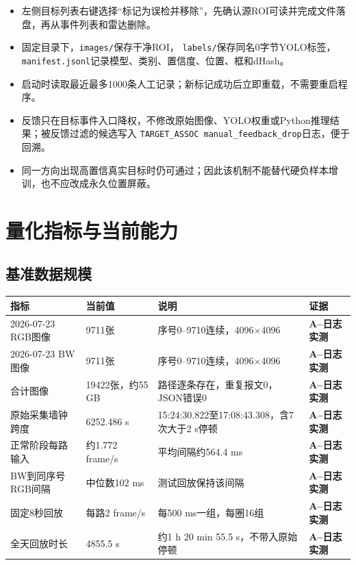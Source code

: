 \documentclass[UTF8,a4paper,11pt,openany]{ctexrep}
\newcommand{\metricA}{\textcolor{dmxgreen}{\textbf{A--日志实测}}}
\begin{document}
\begin{itemize}
  \item 左侧目标列表右键选择“标记为误检并移除”，先确认源ROI可读并完成文件落盘，再从事件列表和雷达删除。
  \item 固定目录下，\texttt{images/}保存干净ROI，
  \texttt{labels/}保存同名0字节YOLO标签，\texttt{manifest.jsonl}记录模型、类别、置信度、位置、框和dHash。
  \item 启动时读取最近最多1000条人工记录；新标记成功后立即重载，不需要重启程序。
  \item 反馈只在目标事件入口降权，不修改原始图像、YOLO权重或Python推理结果；被反馈过滤的候选写入
  \texttt{TARGET\_ASSOC manual\_feedback\_drop}日志，便于回溯。
  \item 同一方向出现高置信真实目标时仍可通过；因此该机制不能替代硬负样本增训，也不应改成永久位置屏蔽。
\end{itemize}

\chapter{量化指标与当前能力}

\section{基准数据规模}

\begin{table}[H]
  \centering
  \begin{tabularx}{\textwidth}{p{4.4cm}p{3.5cm}X p{2.7cm}}
    \toprule
    指标 & 当前值 & 说明 & 证据 \\
    \midrule
    2026-07-23 RGB图像 & 9711张 & 序号0--9710连续，4096$\times$4096 & \metricA \\
    2026-07-23 BW图像 & 9711张 & 序号0--9710连续，4096$\times$4096 & \metricA \\
    合计图像 & 19422张，约55 GB & 路径逐条存在，重复报文0，JSON错误0 & \metricA \\
    原始采集墙钟跨度 & 6252.486 s & 15:24:30.822至17:08:43.308，含7次大于2 s停顿 & \metricA \\
    正常阶段每路输入 & 约1.772 frame/s & 平均间隔约564.4 ms & \metricA \\
    BW到同序号RGB间隔 & 中位数102 ms & 测试回放保持该间隔 & \metricA \\
    固定8秒回放 & 每路2 frame/s & 每500 ms一组，每圈16组 & \metricA \\
    全天回放时长 & 4855.5 s & 约1 h 20 min 55.5 s，不带入原始停顿 & \metricA \\
    \bottomrule
  \end{tabularx}
\end{table}
\end{document}
